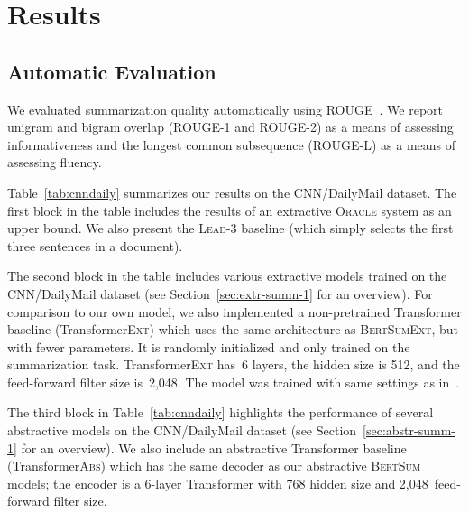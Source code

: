 \documentclass[11pt,a4paper]{article}
\begin{document}
    
    
    
    
    \section{Results}
    \label{sec:results}
    
    \subsection{Automatic Evaluation}
    
    We evaluated summarization quality automatically using ROUGE~\cite{lin:2004:ACLsummarization}.  We report unigram and bigram overlap (ROUGE-1
    and ROUGE-2) as a means of assessing informativeness and the longest
    common subsequence (ROUGE-L) as a means of assessing
    fluency. 
    
    
    
    
    
    
Table~\ref{tab:cnndaily} summarizes our results on the CNN/DailyMail
    dataset.  The first block in the table includes the results of an
    extractive \textsc{Oracle} system as an upper bound.  We also present the \textsc{Lead-3} baseline
    (which simply selects the first three sentences in a document).
    
    The second block in the table includes various extractive models
    trained on the CNN/DailyMail dataset (see
    Section~\ref{sec:extr-summ-1} for an overview). For comparison to our
    own model, we also implemented a non-pretrained Transformer baseline
    (Transformer\textsc{Ext}) which uses the same architecture as
    \textsc{BertSumExt}, but with fewer parameters. It is randomly initialized
    and only trained on the summarization task. Transformer\textsc{Ext}
    has~6 layers, the hidden size is 512, and the feed-forward filter size
    is~2,048. The model was trained with same settings as
    in~\citet{vaswani2017attention}.
    
    The third block in Table~\ref{tab:cnndaily} highlights the performance
    of several abstractive models on the CNN/DailyMail dataset (see
    Section~\ref{sec:abstr-summ-1} for an overview). We also include an
    abstractive Transformer baseline (Transformer\textsc{Abs}) which has
    the same decoder as our abstractive \textsc{BertSum} models; the encoder
    is a 6-layer Transformer with 768 hidden size and 2,048~feed-forward
    filter size.
    
\end{document}

